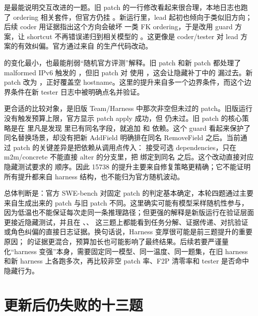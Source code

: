 \documentclass[UTF8,a4paper,11pt]{ctexart}
\begin{document}
 是最能说明交互改进的一题。旧 patch 的一行修改看起来很合理，本地日志也跑了 ordering 相关套件，但官方仍挂 。新运行里，lead 起初也倾向于类似旧方向；后续 coder 用证据指出这个方向会破坏  一类 FK ordering，于是改用 guard 方案，让  shortcut 不再错误递归到相关模型的 。这更像是 coder/tester 对 lead 方案的有效纠偏。官方通过来自  的生产代码改动。

 的变化最小，也最能削弱“随机官方评测”解释。旧 patch 和新 patch 都处理了 malformed IPv6 触发的 ，但旧 patch 对  使用 ，这会让隐藏补丁中的  漏过去。新 patch 改为 ，正好覆盖空 hostname。这里的提升来自多一个边界条件，而这个边界条件在新 tester 日志中被明确点名并验证。

 更合适的比较对象，是旧版 Team/Harness 中那次非空但未过的 patch。旧版运行没有触发预算上限，官方显示 patch apply 成功，但  仍未过。旧 patch 的核心策略是在  里凡是发现  里已有同名字段，就追加  和  依赖。这个 guard 看起来保护了同名替换场景，却没有把新 AddField 明确排在同名 RemoveField 之后。当前通过 patch 的关键差异是把依赖从调用点传入： 接受可选 dependencies，只在 m2m/concrete 不能直接 alter 的分支里，把  绑定到同名  之后。这个改动直接对应隐藏测试要求的  顺序。因此 15738 的提升主要来自修复策略更精确；它不能证明所有提升都来自 harness 结构，也不能归为官方随机波动。

总体判断是：官方 SWE-bench 对固定 patch 的判定基本确定，本轮四题通过主要来自生成出来的 patch 与旧 patch 不同。这里确实可能有模型采样随机性参与，因为低温也不能保证每次走同一条推理路径；但更强的解释是新版运行在验证层面更接近隐藏测试，并且在 、、 这三题上都能看到任务分解、证据传递、对抗验证或角色纠偏的直接日志证据。换句话说，Harness 变厚很可能是前三题提升的重要原因； 的证据更混合，预算加长也可能影响了最终结果。后续若要严谨量化“harness 变强”本身，需要固定同一模型、同一温度、同一题集，在旧 harness 和新 harness 上各跑多次，再比较非空 patch 率、F2P 清零率和 tester 是否命中隐藏行为。

\section{更新后仍失败的十三题}
\end{document}
